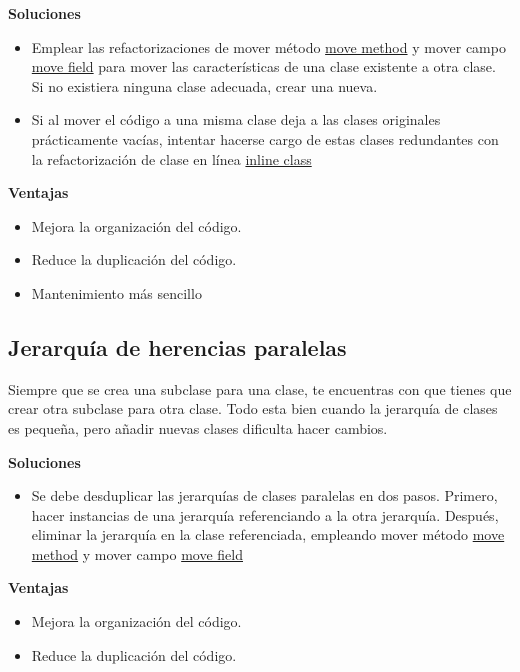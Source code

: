 \documentclass[11pt,a4paper,oneside]{book}
\begin{document}
\textbf{Soluciones}
\begin{itemize}
    \item Emplear las refactorizaciones de mover método \hyperref[moveMethod]{move method} y mover campo \hyperref[moveField]{move field} para mover las características de una clase existente a otra clase. Si no existiera ninguna clase adecuada, crear una nueva.
    \item Si al mover el código a una misma clase deja a las clases originales prácticamente vacías, intentar hacerse cargo de estas clases redundantes con la refactorización de clase en línea \hyperref[inlineClass]{inline class}
\end{itemize} 

\textbf{Ventajas}
\begin{itemize}
    \item Mejora la organización del código.
    \item Reduce la duplicación del código.
    \item Mantenimiento más sencillo
\end{itemize}

\subsection{Jerarquía de herencias paralelas}
Siempre que se crea una subclase para una clase, te encuentras con que tienes que crear otra subclase para otra clase.
\newline
Todo esta bien cuando la jerarquía de clases es pequeña, pero añadir nuevas clases dificulta hacer cambios.

\textbf{Soluciones}
\begin{itemize}
    \item Se debe desduplicar las jerarquías de clases paralelas en dos pasos. Primero, hacer instancias de una jerarquía referenciando a la otra jerarquía. Después, eliminar la jerarquía en la clase referenciada, empleando mover método \hyperref[moveMethod]{move method} y mover campo \hyperref[moveField]{move field}
\end{itemize} 

\textbf{Ventajas}
\begin{itemize}
    \item Mejora la organización del código.
    \item Reduce la duplicación del código.
\end{itemize}


\end{document}
